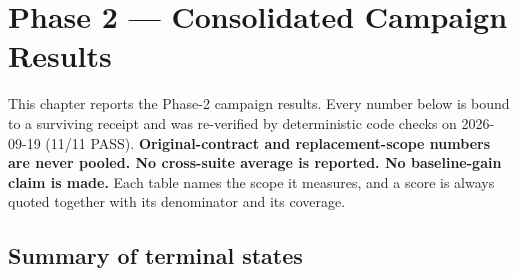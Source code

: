 \chapter{Phase 2 --- Consolidated Campaign Results}
\label{ch:p2results}

This chapter reports the Phase-2 campaign results. Every number below is bound to
a surviving receipt and was re-verified by deterministic code checks on
2026-09-19 (11/11 PASS). \textbf{Original-contract and replacement-scope numbers
are never pooled. No cross-suite average is reported. No baseline-gain claim is
made.} Each table names the scope it measures, and a score is always quoted
together with its denominator and its coverage.

\section{Summary of terminal states}

